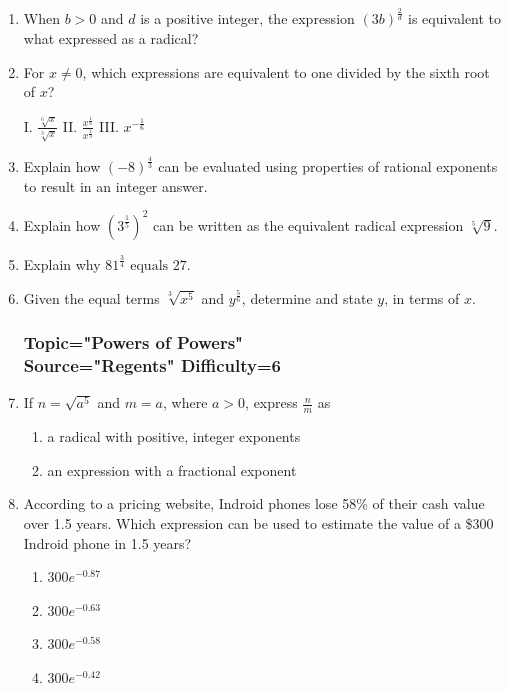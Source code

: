 \documentclass[12pt, oneside]{article}
\begin{document}
\begin{enumerate}
\item When $b>0$ and $d$ is a positive integer, the expression $\displaystyle \left(3b \right)^\frac{2}{d}$ is equivalent to what expressed as a radical? %


\item For $x \neq 0$, which expressions are equivalent to one divided by the sixth root of $x$?
\begin{center}
    I. $\frac{\sqrt[6]{x}}{\sqrt[3]{x}}$ \qquad  II. $\displaystyle \frac{x^\frac{1}{6}}{x^\frac{1}{3}}$  \qquad  III. $x^{-\frac{1}{6}}$
\end{center}


\item Explain how $\displaystyle (-8)^\frac{4}{3}$ can be evaluated using properties of rational exponents to result in an integer answer.

\item Explain how $\displaystyle \left(3^{\frac{1}{5}} \right)^2$ can be written as the equivalent radical expression $\sqrt[5]9$. %

\item Explain why $81^\frac{3}{4} \text{ equals } 27$.

\item Given the equal terms $\displaystyle \sqrt[3]{x^5}$ and $\displaystyle y^{\frac{5}{6}}$, determine and state $y$, in terms of $x$. %

\newpage
\subsubsection*{Topic="Powers of Powers"\\
Source="Regents" 
Difficulty=6}

\item If $n=\sqrt{a^5}$ and $m=a$, where $a > 0$, express $\frac{n}{m}$ as 
\begin{enumerate}
    \item a radical with positive, integer exponents
    \item an expression with a fractional exponent
\end{enumerate}

\item According to a pricing website, Indroid phones lose 58\% of their cash value over 1.5 years. Which expression can be used to estimate the value of a \$300 Indroid phone in 1.5 years?
\begin{enumerate}
    \item $300e^{-0.87}$
    \item $300e^{-0.63}$
    \item $300e^{-0.58}$
    \item $300e^{-0.42}$
\end{enumerate} %



\end{enumerate}
\end{document}
